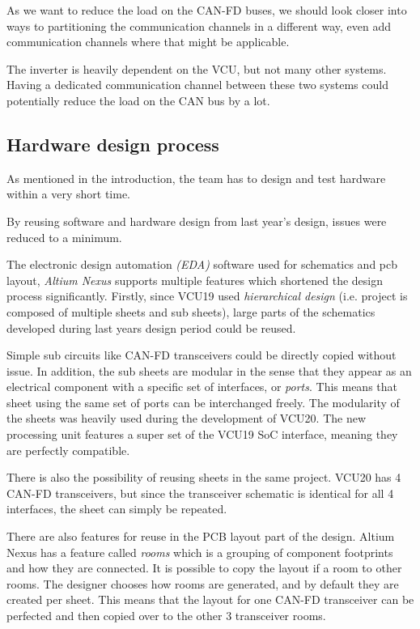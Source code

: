 As we want to reduce the load on the CAN-FD buses, we should look closer into ways to partitioning the communication channels in a different way, even add communication channels where that might be applicable. 

The inverter is heavily dependent on the VCU, but not many other systems. Having a dedicated communication channel between these two systems could potentially reduce the load on the CAN bus by a lot.


\subsection{Hardware design process}

As mentioned in the introduction, the team has to design and test hardware within a very short time.

By reusing software and hardware design from last year's design, issues were reduced to a minimum.

The electronic design automation \emph{(EDA)} software used for schematics and pcb layout, \emph{Altium Nexus} supports multiple features which shortened the design process significantly. Firstly, since VCU19 used \emph{hierarchical design} (i.e. project is composed of multiple sheets and sub sheets), large parts of the schematics developed during last years design period could be reused. 

Simple sub circuits like CAN-FD transceivers could be directly copied without issue. In addition, the sub sheets are modular in the sense that they appear as an electrical component with a specific set of interfaces, or \emph{ports}. This means that sheet using the same set of ports can be interchanged freely. The modularity of the sheets was heavily used during the development of VCU20. The new processing unit features a super set of the VCU19 SoC interface, meaning they are perfectly compatible. 

There is also the possibility of reusing sheets in the same project. VCU20 has 4 CAN-FD transceivers, but since the transceiver schematic is identical for all 4 interfaces, the sheet can simply be repeated. 

There are also features for reuse in the PCB layout part of the design. Altium Nexus has a feature called \emph{rooms} which is a grouping of component footprints and how they are connected. It is possible to copy the layout if a room to other rooms. The designer chooses how rooms are generated, and by default they are created per sheet. This means that the layout for one CAN-FD transceiver can be perfected and then copied over to the other 3 transceiver rooms.




